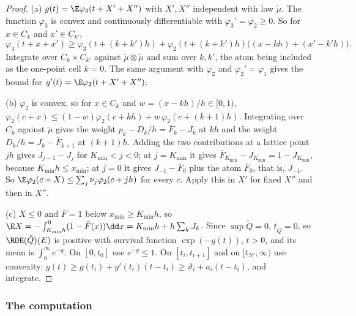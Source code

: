 \begin{proof}
(a) $g(t)=\E\varphi_3(t+X'+X'')$ with $X',X''$ independent with law $\tilde\mu$. The function
$\varphi_3$ is convex and continuously differentiable with $\varphi_3'=\varphi_2\ge0$. So for
$x\in C_k$ and $x'\in C_{k'}$,
\[
  \varphi_3(t+x+x')\ge\varphi_3(t+(k+k')h)+\varphi_2(t+(k+k')h)\bigl((x-kh)+(x'-k'h)\bigr).
\]
Integrate over $C_k\times C_{k'}$ against $\tilde\mu\otimes\tilde\mu$ and sum over $k,k'$, the
atom being included as the one-point cell $k=0$. The same argument with $\varphi_2$ and
$\varphi_2'=\varphi_1$ gives the bound for $g'(t)=\E\varphi_2(t+X'+X'')$.

(b) $\varphi_2$ is convex, so for $x\in C_k$ and $w=(x-kh)/h\in[0,1)$,
$\varphi_2(c+x)\le(1-w)\varphi_2(c+kh)+w\,\varphi_2(c+(k+1)h)$. Integrating over $C_k$ against
$\tilde\mu$ gives the weight $p_k-D_k/h=\bar F_k-J_k$ at $kh$ and the weight
$D_k/h=J_k-\bar F_{k+1}$ at $(k+1)h$. Adding the two contributions at a lattice point $jh$
gives $J_{j-1}-J_j$ for $K_{\min}<j<0$; at $j=K_{\min}$ it gives $\bar F_{K_{\min}}-J_{K_{\min}}
=1-J_{K_{\min}}$, because $K_{\min}h\le x_{\min}$; at $j=0$ it gives $J_{-1}-\bar F_0$ plus the
atom $\bar F_0$, that is, $J_{-1}$. So $\E\varphi_2(c+X)\le\sum_j\nu_j\varphi_2(c+jh)$ for
every $c$. Apply this in $X'$ for fixed $X''$ and then in $X''$.

(c) $X\le0$ and $\bar F=1$ below $x_{\min}\ge K_{\min}h$, so
$\E X=-\int_{K_{\min}h}^0(1-\bar F(x))\dd x=K_{\min}h+h\sum_kJ_k$. Since $\sup\tilde Q=0$,
$t_{\tilde Q}=0$, so $\RDE(\tilde Q)(E)$ is positive with survival function $\exp(-g(t))$,
$t>0$, and its mean is $\int_0^\infty e^{-g}$. On $[0,t_0]$ use $e^{-g}\le1$. On
$[t_i,t_{i+1}]$ and on $[t_{N'},\infty)$ use convexity:
$g(t)\ge g(t_i)+g'(t_i)(t-t_i)\ge\vartheta_i+a_i(t-t_i)$, and integrate.
\end{proof}

\subsubsection*{The computation}

